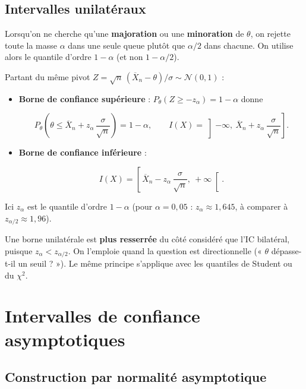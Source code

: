 \subsection{Intervalles unilatéraux}

Lorsqu'on ne cherche qu'une \textbf{majoration} ou une \textbf{minoration} de $\theta$, on rejette toute la masse $\alpha$ dans une seule queue plutôt que $\alpha/2$ dans chacune. On utilise alors le quantile d'ordre $1-\alpha$ (et non $1-\alpha/2$).

\begin{exemple} 
Partant du même pivot $Z = \sqrt n\,(\overline X_n - \theta)/\sigma \sim \mathcal N(0,1)$ :

\begin{itemize}
\item \textbf{Borne de confiance supérieure} : $P_\theta(Z \ge -z_\alpha) = 1-\alpha$ donne

$$
P_\theta\!\left(\theta \le \overline X_n + z_\alpha\,\frac{\sigma}{\sqrt n}\right) = 1-\alpha,
\qquad
I(X) = \left]-\infty,\ \overline X_n + z_\alpha\,\frac{\sigma}{\sqrt n}\right].
$$
\item \textbf{Borne de confiance inférieure} :

$$
I(X) = \left[\,\overline X_n - z_\alpha\,\frac{\sigma}{\sqrt n},\ +\infty\right[.
$$
\end{itemize}

Ici $z_\alpha$ est le quantile d'ordre $1-\alpha$ (pour $\alpha = 0{,}05$ : $z_\alpha \approx 1{,}645$, à comparer à $z_{\alpha/2} \approx 1{,}96$).
\end{exemple}

\begin{remarque} 
Une borne unilatérale est \textbf{plus resserrée} du côté considéré que l'IC bilatéral, puisque $z_\alpha < z_{\alpha/2}$. On l'emploie quand la question est directionnelle (« $\theta$ dépasse-t-il un seuil ? »). Le même principe s'applique avec les quantiles de Student ou du $\chi^2$.
\end{remarque}

\section{Intervalles de confiance asymptotiques}

\subsection{Construction par normalité asymptotique}

